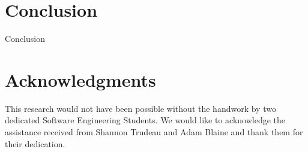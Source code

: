 \documentclass{sig-alternate}
\begin{document}
\section{Conclusion}
\label{sec: conclusion}

Conclusion



\section{Acknowledgments}

This research would not have been possible without the handwork by two dedicated Software Engineering Students. We would like to acknowledge the assistance received from Shannon Trudeau and Adam Blaine and thank them for their dedication.





\end{document}
